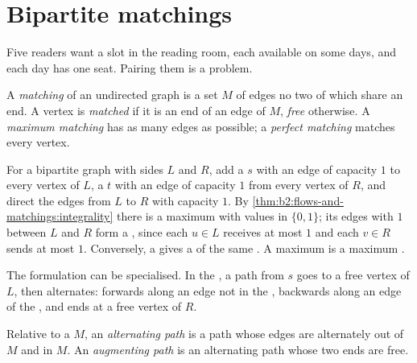 \section{Bipartite matchings}\label{sec:b2:flows-and-matchings:matchings}

Five readers want a slot in the reading room, each available on some days, and each day has one seat. Pairing them is a
 problem.

\begin{definition}[Matching]\label{def:b2:flows-and-matchings:matching}
A \emph{matching} of an undirected graph is a set $M$ of edges no two of which share an end. A vertex is
\emph{matched} if it is an end of an edge of $M$, \emph{free} otherwise. A \emph{maximum matching} has as many edges as
possible; a \emph{perfect matching} matches every vertex.
\end{definition}

For a bipartite graph with sides $L$ and $R$, add a  $s$ with an edge of capacity $1$ to every vertex of $L$, a
 $t$ with an edge of capacity $1$ from every vertex of $R$, and direct the edges from $L$ to $R$ with capacity $1$.
By \cref{thm:b2:flows-and-matchings:integrality} there is a maximum  with values in $\{0, 1\}$; its edges with 
$1$ between $L$ and $R$ form a , since each $u \in L$ receives at most $1$ and each $v \in R$ sends at most $1$.
Conversely, a  gives a  of the same . A maximum  is a maximum .

The  formulation can be specialised. In the , a path from $s$ goes to a free vertex of $L$, then
alternates: forwards along an edge not in the , backwards along an edge of the , and ends at a free
vertex of $R$.

\begin{definition}\label{def:b2:flows-and-matchings:alternating}
Relative to a  $M$, an \emph{alternating path} is a path whose edges are alternately out
of $M$ and in $M$. An \emph{augmenting path} is an alternating path whose two ends are
free.
\end{definition}

